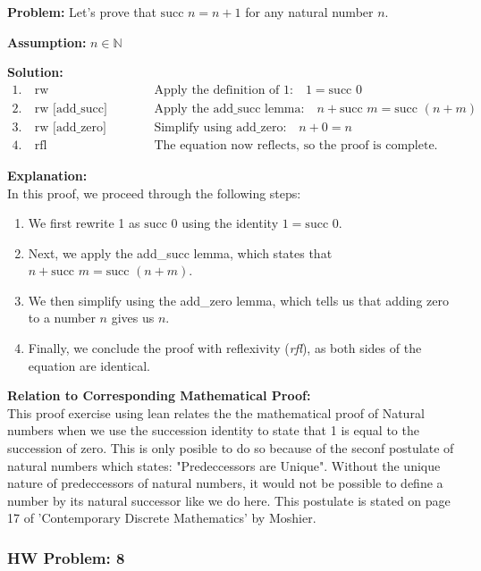 \documentclass{article}
\theoremstyle{theorem}
\theoremstyle{definition}
\theoremstyle{remark}
\begin{document}
\textbf{Problem:} Let's prove that \(\text{succ } n = n + 1\) for any natural number \( n \).

\textbf{Assumption:} \( n \in \mathbb{N} \)

\textbf{Solution:}
\begin{align*}
1. &\ \text{rw [one\_eq\_succ\_zero]} & \text{Apply the definition of 1:} \quad 1 = \text{succ } 0 \\
2. &\ \text{rw [add\_succ]} & \text{Apply the add\_succ lemma:} \quad n + \text{succ } m = \text{succ } (n + m) \\
3. &\ \text{rw [add\_zero]} & \text{Simplify using add\_zero:} \quad n + 0 = n \\
4. &\ \text{rfl} & \text{The equation now reflects, so the proof is complete.}
\end{align*}

\textbf{Explanation:} \\
In this proof, we proceed through the following steps:
\begin{enumerate}
    \item We first rewrite 1 as \(\text{succ } 0\) using the identity \( 1 = \text{succ } 0 \).
    \item Next, we apply the add\_succ lemma, which states that \( n + \text{succ } m = \text{succ } (n + m) \).
    \item We then simplify using the add\_zero lemma, which tells us that adding zero to a number \( n \) gives us \( n \).
    \item Finally, we conclude the proof with reflexivity (\emph{rfl}), as both sides of the equation are identical.
\end{enumerate}

\textbf{Relation to Corresponding Mathematical Proof:} \\
This proof exercise using lean relates the the mathematical proof of Natural numbers when we use the succession identity to state that 1 is equal to the succession of zero. This is only posible to do so because of the seconf postulate of natural numbers which states: "Predeccessors are Unique". Without the unique nature of predeccessors of natural numbers, it would not be possible to define a number by its natural successor like we do here. This postulate is stated on page 17 of 'Contemporary Discrete Mathematics' by Moshier.


\subsubsection{HW Problem: 8}
\end{document}
